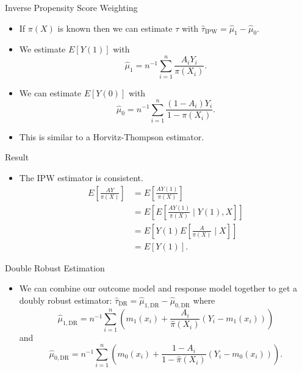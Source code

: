 \documentclass[handout]{beamer} %
\begin{document}
\begin{frame}{Inverse Propensity Score Weighting}

\begin{itemize}
    \item If $\pi(X)$ is known then we can estimate $\tau$ with 
    $\hat \tau_{\text{IPW}} = \hat \mu_1 - \hat \mu_0$. 
    \item We estimate $E[Y(1)]$ with
    \[\hat \mu_1 = n^{-1} \sum_{i = 1}^n \frac{A_i Y_i}{\pi(X_i)}.\]
    \item We can estimate $E[Y(0)]$ with
    \[\hat \mu_0 = n^{-1} \sum_{i = 1}^n \frac{(1 - A_i) Y_i}{1 - \pi(X_i)}.\]
    \item This is similar to a Horvitz-Thompson estimator.
\end{itemize}
\end{frame}

\begin{frame}{Result}

\begin{itemize}
    \item The IPW estimator is consistent.
    \begin{align*}
        E\left[\frac{AY}{\pi(X)}\right] 
        &= E\left[\frac{AY(1)}{\pi(X)}\right] \\
        &= E\left[E\left[\frac{AY(1)}{\pi(X)} \mid Y(1), X\right]\right] \\
        &= E\left[Y(1) E\left[\frac{A}{\pi(X)} \mid X\right]\right]\\
        &= E[Y(1)].
    \end{align*}
\end{itemize}

\end{frame}

\begin{frame}{Double Robust Estimation}

\begin{itemize}
    \item We can combine our outcome model and response model together to get a
      doubly robust estimator: $\hat \tau_{\text{DR}} = \hat \mu_{1, \text{DR}}
      - \hat \mu_{0, \text{DR}}$ where
    \[\hat \mu_{1,\text{DR}} = n^{-1} \sum_{i = 1}^n \left(m_1(x_i) + 
    \frac{A_i}{\hat \pi(X_i)}(Y_i - m_1(x_i))\right)\]
    and 
    \[\hat \mu_{0,\text{DR}} = n^{-1} \sum_{i = 1}^n \left(m_0(x_i) + 
    \frac{1 - A_i}{1 - \hat \pi(X_i)}(Y_i - m_0(x_i))\right).\]
\end{itemize}
\end{frame}
\end{document}
